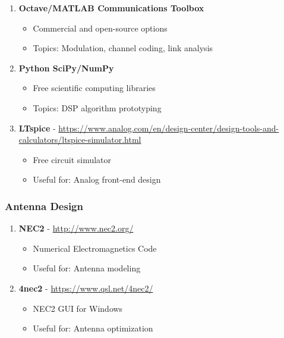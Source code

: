 \begin{enumerate}
\def\labelenumi{\arabic{enumi}.}
\setcounter{enumi}{51}
\tightlist
\item
  \textbf{Octave/MATLAB Communications Toolbox}

  \begin{itemize}
  \tightlist
  \item
    Commercial and open-source options
  \item
    Topics: Modulation, channel coding, link analysis
  \end{itemize}
\item
  \textbf{Python SciPy/NumPy}

  \begin{itemize}
  \tightlist
  \item
    Free scientific computing libraries
  \item
    Topics: DSP algorithm prototyping
  \end{itemize}
\item
  \textbf{LTspice} - \url{https://www.analog.com/en/design-center/design-tools-and-calculators/ltspice-simulator.html}

  \begin{itemize}
  \tightlist
  \item
    Free circuit simulator
  \item
    Useful for: Analog front-end design
  \end{itemize}
\end{enumerate}

\subsubsection{Antenna Design}\label{antenna-design}

\begin{enumerate}
\def\labelenumi{\arabic{enumi}.}
\setcounter{enumi}{54}
\tightlist
\item
  \textbf{NEC2} - \url{http://www.nec2.org/}

  \begin{itemize}
  \tightlist
  \item
    Numerical Electromagnetics Code
  \item
    Useful for: Antenna modeling
  \end{itemize}
\item
  \textbf{4nec2} - \url{https://www.qsl.net/4nec2/}

  \begin{itemize}
  \tightlist
  \item
    NEC2 GUI for Windows
  \item
    Useful for: Antenna optimization
  \end{itemize}
\end{enumerate}

